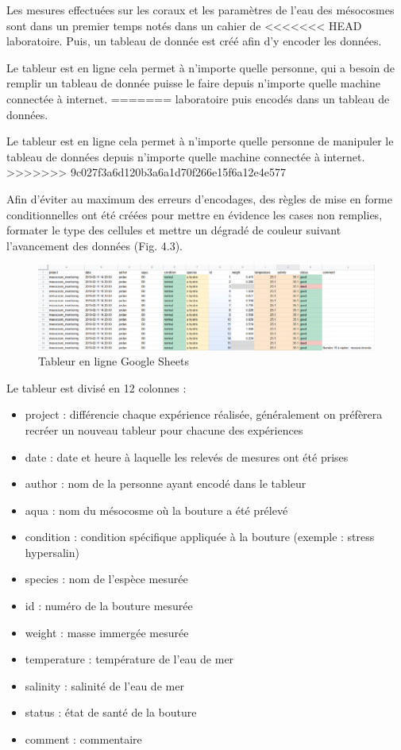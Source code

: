 \documentclass[]{report}
\providecommand{\tightlist}{%
  \setlength{\itemsep}{0pt}\setlength{\parskip}{0pt}}
\begin{document}
Les mesures effectuées sur les coraux et les paramètres de l'eau des
mésocosmes sont dans un premier temps notés dans un cahier de
<<<<<<< HEAD
laboratoire. Puis, un tableau de donnée est créé afin d'y encoder les
données.

Le tableur est en ligne cela permet à n'importe quelle personne, qui a
besoin de remplir un tableau de donnée puisse le faire depuis n'importe
quelle machine connectée à internet.
=======
laboratoire puis encodés dans un tableau de données.

Le tableur est en ligne cela permet à n'importe quelle personne de
manipuler le tableau de données depuis n'importe quelle machine
connectée à internet.
>>>>>>> 9c027f3a6d120b3a6a1d70f266e15f6a12e4e577

Afin d'éviter au maximum des erreurs d'encodages, des règles de mise en
forme conditionnelles ont été créées pour mettre en évidence les cases
non remplies, formater le type des cellules et mettre un dégradé de
couleur suivant l'avancement des données (Fig. 4.3).

\begin{figure}[h!]
\includegraphics[]{../image/tableur-gs.PNG}
\caption{Tableur en ligne Google Sheets}
\end{figure}

Le tableur est divisé en 12 colonnes :

\begin{itemize}
\tightlist
\item
  project : différencie chaque expérience réalisée, généralement on
  préfèrera recréer un nouveau tableur pour chacune des expériences
\item
  date : date et heure à laquelle les relevés de mesures ont été prises
\item
  author : nom de la personne ayant encodé dans le tableur
\item
  aqua : nom du mésocosme où la bouture a été prélevé
\item
  condition : condition spécifique appliquée à la bouture (exemple :
  stress hypersalin)
\item
  species : nom de l'espèce mesurée
\item
  id : numéro de la bouture mesurée
\item
  weight : masse immergée mesurée
\item
  temperature : température de l'eau de mer
\item
  salinity : salinité de l'eau de mer
\item
  status : état de santé de la bouture
\item
  comment : commentaire
\end{itemize}
\end{document}
